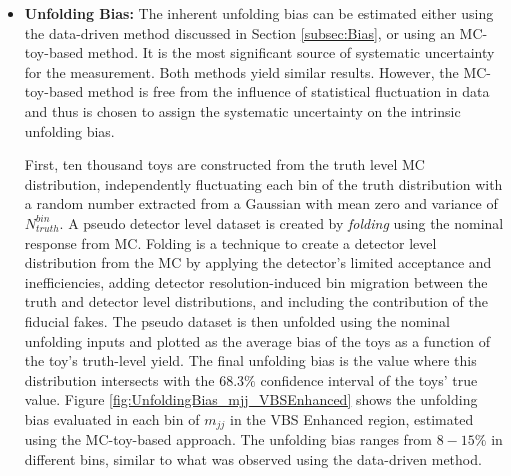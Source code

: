 \begin{itemize}
    \item{\textbf{Unfolding Bias:} The inherent unfolding bias can be estimated either using the data-driven method discussed in Section \ref{subsec:Bias}, or using an MC-toy-based method. It is the most significant source of systematic uncertainty for the measurement. Both methods yield similar results. However, the MC-toy-based method is free from the influence of statistical fluctuation in data and thus is chosen to assign the systematic uncertainty on the intrinsic unfolding bias. 

    First, ten thousand toys are constructed from the truth level MC distribution, independently fluctuating each bin of the truth distribution with a random number extracted from a Gaussian with mean zero and variance of $N_{truth}^{bin}$. A pseudo detector level dataset is created by \textit{folding} using the nominal response from MC. Folding is a technique to create a detector level distribution from the MC by applying the detector's limited acceptance and inefficiencies, adding detector resolution-induced bin migration between the truth and detector level distributions, and including the contribution of the fiducial fakes. The pseudo dataset is then unfolded using the nominal unfolding inputs and plotted as the average bias of the toys as a function of the toy's truth-level yield. The final unfolding bias is the value where this distribution intersects with the $68.3\%$ confidence interval of the toys' true value. Figure \ref{fig:UnfoldingBias_mjj_VBSEnhanced} shows the unfolding bias evaluated in each bin of $m_{jj}$ in the VBS Enhanced region, estimated using the MC-toy-based approach. The unfolding bias ranges from $8-15\%$ in different bins, similar to what was observed using the data-driven method. 

}
\end{itemize}
